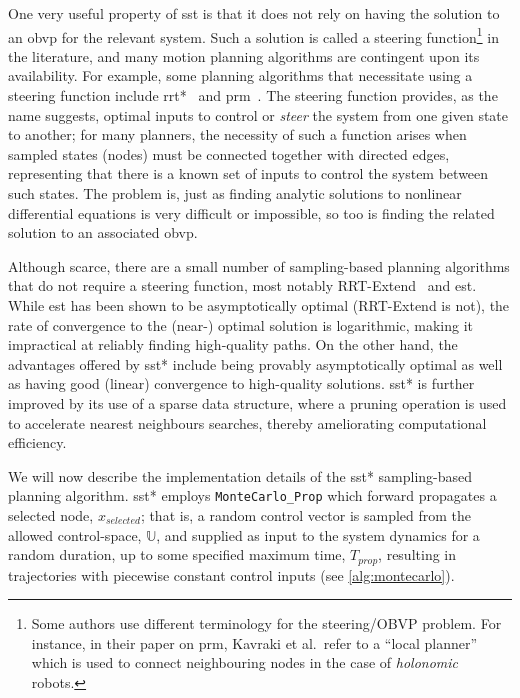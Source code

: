 One very useful property of \gls{sst} is that it does not rely on having the solution to an \gls{obvp} for the relevant system. Such a solution is called a steering function\footnote{Some authors use different terminology for the steering/OBVP problem. For instance, in their paper on \gls{prm}, Kavraki et al.\ refer to a ``local planner'' which is used to connect neighbouring nodes in the case of \emph{holonomic} robots.} in the literature, and many motion planning algorithms are contingent upon its availability. For example, some planning algorithms that necessitate using a steering function include \gls{rrt}*~\cite{Karaman2011} and \gls{prm}~\cite{Kavraki1996}. The steering function provides, as the name suggests, optimal inputs to control or \emph{steer} the system from one given state to another; for many planners, the necessity of such a function arises when sampled states (nodes) must be connected together with directed edges, representing that there is a known set of inputs to control the system between such states. The problem is, just as finding analytic solutions to nonlinear differential equations is very difficult or impossible, so too is finding the related solution to an associated \gls{obvp}\@.

Although scarce, there are a small number of sampling-based planning algorithms that do not require a steering function, most notably RRT-Extend~\cite{LaValle2001} and \gls{est}. While \gls{est} has been shown to be asymptotically optimal (RRT-Extend is not), the rate of convergence to the (near-) optimal solution is logarithmic, making it impractical at reliably finding high-quality paths. On the other hand, the advantages offered by \gls{sst}* include being provably asymptotically optimal as well as having good (linear) convergence to high-quality solutions. \gls{sst}* is further improved by its use of a sparse data structure, where a pruning operation is used to accelerate nearest neighbours searches, thereby ameliorating computational efficiency.


We will now describe the implementation details of the \gls{sst}* sampling-based planning algorithm. \gls{sst}* employs \texttt{MonteCarlo\_Prop} which forward propagates a selected node, $x_{selected}$; that is, a random control vector is sampled from the allowed control-space, $\mathbb{U}$, and supplied as input to the system dynamics for a random duration, up to some specified maximum time, $T_{prop}$, resulting in trajectories with piecewise constant control inputs (see \autoref{alg:montecarlo}).

